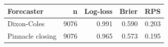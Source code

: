 \begin{tabular}{lrrrr}
\toprule
Forecaster & n & Log-loss & Brier & RPS \\
\midrule
Dixon-Coles & 9076 & 0.991 & 0.590 & 0.203 \\
Pinnacle closing & 9076 & 0.965 & 0.573 & 0.195 \\
\bottomrule
\end{tabular}

